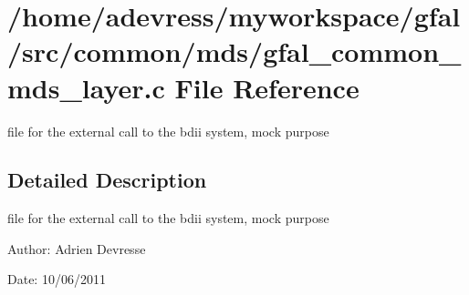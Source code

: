 \section{/home/adevress/myworkspace/gfal/src/common/mds/gfal\_\-common\_\-mds\_\-layer.c File Reference}
\label{gfal__common__mds__layer_8c}
file for the external call to the bdii system, mock purpose 



\subsection{Detailed Description}
file for the external call to the bdii system, mock purpose 

\begin{Desc}
\item[Author:]Adrien Devresse \end{Desc}
\begin{Desc}
\item[Date:]10/06/2011 \end{Desc}
